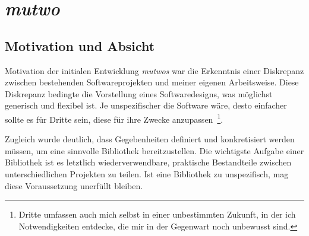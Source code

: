 \documentclass[12pt,a4paper,ngerman]{article}
\begin{document}




\section{\emph{mutwo}}

\subsection{Motivation und Absicht}
\label{motivationUndAbsicht}

Motivation der initialen Entwicklung \emph{mutwos} war die Erkenntnis einer Diskrepanz zwischen bestehenden Softwareprojekten und meiner eigenen Arbeitsweise.
Diese Diskrepanz bedingte die Vorstellung eines Softwaredesigns, was möglichst generisch und flexibel ist.
Je unspezifischer die Software wäre, desto einfacher sollte es für Dritte sein, diese für ihre Zwecke anzupassen~\footnote{%
    Dritte umfassen auch mich selbst in einer unbestimmten Zukunft, in der ich Notwendigkeiten entdecke, die mir in der Gegenwart noch unbewusst sind.%
}.

\smallskip

Zugleich wurde deutlich, dass Gegebenheiten definiert und konkretisiert werden müssen, um eine sinnvolle Bibliothek bereitzustellen.
Die wichtigste Aufgabe einer Bibliothek ist es letztlich wiederverwendbare, praktische Bestandteile zwischen unterschiedlichen Projekten zu teilen.
Ist eine Bibliothek zu unspezifisch, mag diese Voraussetzung unerfüllt bleiben.
\end{document}
